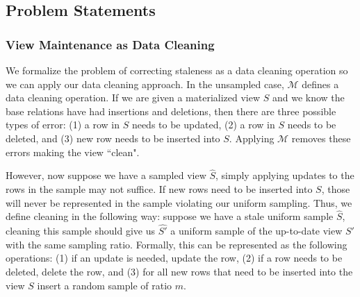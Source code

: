 \subsection{Problem Statements}
\subsubsection{View Maintenance as Data Cleaning}\label{cleaning}
We formalize the problem of correcting staleness as a data cleaning operation so we can apply our data cleaning approach.
In the unsampled case, $\mathcal{M}$ defines a data cleaning operation.
If we are given a materialized view $S$ and we know the base relations have had insertions and deletions, then there are three possible types of error:
(1) a row in $S$ needs to be updated, (2) a row in $S$ needs to be deleted, and (3) new row needs to be inserted into $S$.
Applying $\mathcal{M}$ removes these errors making the view ``clean".

However, now suppose we have a sampled view $\hat{S}$, simply applying updates to the rows in the sample may not suffice.
If new rows need to be inserted into $S$, those will never be represented in the sample violating our uniform sampling.
Thus, we define cleaning in the following way: suppose we have a stale uniform sample $\hat{S}$, cleaning this sample
should give us $\hat{S'}$ a uniform sample of the up-to-date view $S'$ with the same sampling ratio.
Formally, this can be represented as the following operations: (1) if an update is needed, update the row, (2) if a row needs to be deleted, delete the row, and (3) for all new rows that need to be inserted into the view $S$ insert a random sample of ratio $m$.

